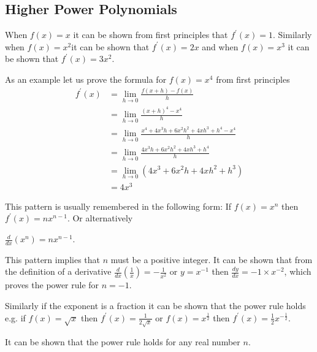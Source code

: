 \subsection*{Higher Power Polynomials}
When $f (x) =x$ it can be shown from first principles that $f^{ \prime } (x) =1$. Similarly when $f (x) =x^{2\text{}}$it can be shown that $f^{ \prime } (x) =2 x$ and when $f (x) =x^{3}$ it can be shown that $f^{ \prime } (x) =3 x^{2}$. 

As an example let us prove the formula for $f (x) =x^{4}$ from first principles
\begin{align*}f^{ \prime } (x) &  = \underset{h \rightarrow 0}{\lim }\frac{f (x +h) -f (x)}{h} \\
 &  = \underset{h \rightarrow 0}{\lim }\frac{(x +h)^{4} -x^{4}}{h} \\
 &  = \underset{h \rightarrow 0}{\lim }\frac{x^{4} +4 x^{3} h +6 x^{2} h^{2} +4 x h^{3} +h^{4} -x^{4}}{h} \\
 &  = \underset{h \rightarrow 0}{\lim }\frac{4 x^{3} h +6 x^{2} h^{2} +4 x h^{3} +h^{4}}{h} \\
 &  = \underset{h \rightarrow 0}{\lim }(4 x^{3} +6 x^{2} h +4 x h^{2} +h^{3}) \\
 &  = 4 x^{3}\end{align*}

This pattern is usually remembered in the following form: If $f (x) =x^{n}$ then $f^{ \prime } (x) =n x^{n -1}$. Or alternatively 
\begin{tcolorbox}
	\begin{center}
$\frac{d}{d x} (x^{n}) =n x^{n -1}$. 
\end{center}
\end{tcolorbox}
	
This pattern implies that $n$ must be a positive integer. It can be shown that from the definition of a derivative $\frac{d}{d x} \genfrac{(}{)}{}{}{1}{x} = -\frac{1}{x^{2}}$ or $y =x^{ -1}$ then $\frac{d y}{d x} = -1 \times x^{ -2}$, which proves the power rule for $n = -1$. 

Similarly if the exponent is a fraction it can be shown that the power rule holds e.g. if $f (x) =\sqrt{x}$ then $f^{ \prime } (x) =\frac{1}{2 \sqrt{x}}$ or $f (x) =x^{\frac{1}{2}}$ then $f^{ \prime } (x) =\frac{1}{2} x^{ -\frac{1}{2}}$. 

It can be shown that the power rule holds for any real number $n$. 

